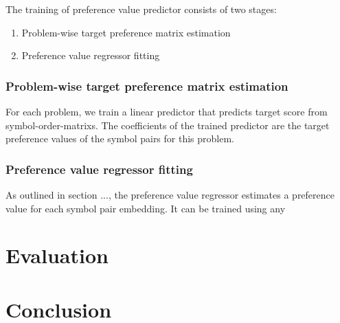 The training of preference value predictor consists of two stages:

\begin{enumerate}
	\item Problem-wise target preference matrix estimation
	\item Preference value regressor fitting
\end{enumerate}

\subsubsection{Problem-wise target preference matrix estimation}

For each problem,
we train a linear predictor
that predicts target score from \glspl{symbol-order-matrix}.
The coefficients of the trained predictor are the target preference values of the symbol pairs for this problem.

\subsubsection{Preference value regressor fitting}

As outlined in section ...,
the preference value regressor estimates a preference value for each symbol pair embedding.
It can be trained using any 

\section{Evaluation}

\section{Conclusion}

\glsaddall
\printglossaries


